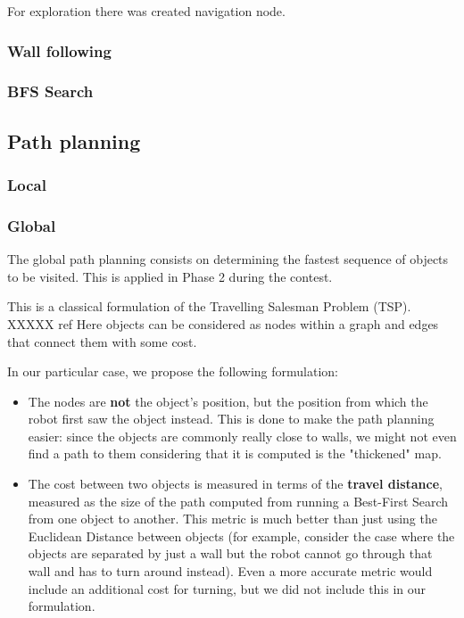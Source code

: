For exploration there was created navigation node. 

\subsubsection{Wall following}
\subsubsection{BFS Search}
\subsection{Path planning}
\subsubsection{Local}

\subsubsection{Global}
The global path planning consists on determining the fastest sequence of objects to be visited. This is applied in Phase 2 during the contest. 

This is a classical formulation of the Travelling Salesman Problem (TSP). XXXXX ref Here objects can be considered as nodes within a graph and edges that connect them with some cost.

In our particular case, we propose the following formulation:
\begin{itemize}
\item The nodes are \textbf{not} the object's position, but the position from which the robot first saw the object instead. This is done to make the path planning easier: since the objects are commonly really close to walls, we might not even find a path to them considering that it is computed is the "thickened" map. 
\item The cost between two objects is measured in terms of the \textbf{travel distance}, measured as the size of the path computed from running a Best-First Search from one object to another. This metric is much better than just using the Euclidean Distance between objects (for example, consider the case where the objects are separated by just a wall but the robot cannot go through that wall and has to turn around instead). Even a more accurate metric would include an additional cost for turning, but we did not include this in our formulation.
\end{itemize}

